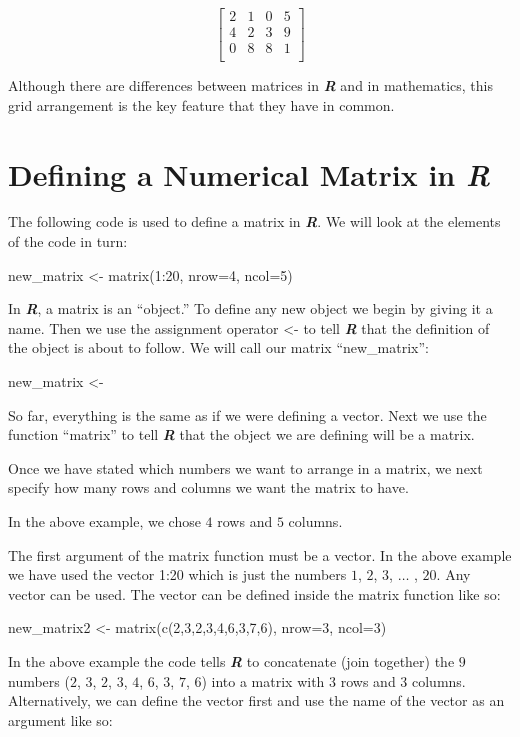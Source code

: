 \documentclass[
]{book}
\begin{document}
\[
\begin{bmatrix}
2 & 1 & 0 & 5 \\
4 & 2 & 3 & 9 \\
0 & 8 & 8 & 1 \\
\end{bmatrix}
\]

Although there are differences between matrices in \textbf{\emph{R}} and in mathematics, this grid arrangement is the key feature that they have in common.

\section{\texorpdfstring{Defining a Numerical Matrix in \textbf{\emph{R}}}{Defining a Numerical Matrix in R}}\label{defining-a-numerical-matrix-in-r}

The following code is used to define a matrix in \textbf{\emph{R}}. We will look at the elements of the code in turn:

new\_matrix \textless- matrix(1:20, nrow=4, ncol=5)

In \textbf{\emph{R}}, a matrix is an ``object.'' To define any new object we begin by giving it a name. Then we use the assignment operator \textless- to tell \textbf{\emph{R}} that the definition of the object is about to follow. We will call our matrix ``new\_matrix'':

new\_matrix \textless-

So far, everything is the same as if we were defining a vector. Next we use the function ``matrix'' to tell \textbf{\emph{R}} that the object we are defining will be a matrix.

Once we have stated which numbers we want to arrange in a matrix, we next specify how many rows and columns we want the matrix to have.

In the above example, we chose \(4\) rows and \(5\) columns.

The first argument of the matrix function must be a vector. In the above example we have used the vector 1:20 which is just the numbers \(1\), \(2\), \(3\), \(\ldots\) , \(20\). Any vector can be used. The vector can be defined inside the matrix function like so:

new\_matrix2 \textless- matrix(c(2,3,2,3,4,6,3,7,6), nrow=3, ncol=3)

In the above example the code tells \textbf{\emph{R}} to concatenate (join together) the \(9\) numbers (\(2\), \(3\), \(2\), \(3\), \(4\), \(6\), \(3\), \(7\), \(6\)) into a matrix with \(3\) rows and \(3\) columns. Alternatively, we can define the vector first and use the name of the vector as an argument like so:
\end{document}
